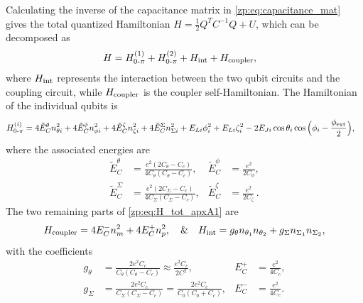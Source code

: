 \begin{widetext}
Calculating the inverse of the capacitance matrix in \cref{zp:eq:capacitance_mat} gives the total quantized Hamiltonian  $H=\frac{1}{2}Q^TC^{-1}Q + U$, which can be decomposed as
\begin{align}\label{zp:eq:H_tot_apxA1}
    H &= H_{0\text{-}\pi}^{(1)} + H_{0\text{-}\pi}^{(2)} + H_{\rm int} + H_{\rm coupler},
\end{align}
where $H_{\rm int}$ represents the interaction between the two qubit circuits and the coupling circuit, while $H_{\rm coupler}$  is the coupler self-Hamiltonian.
The Hamiltonian of the individual \zps qubits is
\begin{align}\label{zp:eq:zp_h_app_i}
    H_{0\text{-}\pi}^{(i)} &=  4\tilde E_C^{\theta} {n}_{\theta i}^2 + 4\tilde E_C^{\phi} {n}_{\phi i}^2  + 4\tilde E_C^{\zeta} {n}_{\zeta i}^2 + 4\tilde E_C^{\Sigma} {n}_{\Sigma i}^2 +
    E_{Li}{\phi}_i^2 + E_{Li}{\zeta}_i^2 - 2E_{Ji}\cos{{\theta}_i}\cos \Big ({\phi}_i - \frac{\phi_{\rm ext}}{2}\Big) ,
\end{align}
where the associated energies are
\begin{subequations}
\begin{align}\label{zp:eq:renormalized_ec}
    \tilde E_{C}^{\theta} &= \frac{e^2(2C_\theta-C_c)}{4C_{\theta}(C_{\theta} - C_c)},
   & \tilde E_{C}^{\phi} &= \frac{e^2}{2C_\phi},
   \\
    \tilde E_{C}^{\Sigma} &= \frac{e^2(2C_\Sigma-C_c)}{4C_{\Sigma}(C_{\Sigma} - C_c)} ,
   & \tilde E_{C}^{\zeta} &= \frac{e^2}{2C_\zeta} \, .
\end{align}
\end{subequations}
The two remaining parts of \cref{zp:eq:H_tot_apxA1} are
\begin{subequations}
\begin{align}
    H_{\rm coupler} = 4E_C^- n_m^2 + 4E_C^+ n_p^2 ,
    \quad {\&}\quad
    H_{\rm int} = g_{\theta} n_{\theta_1}n_{\theta_2} + g_{\Sigma} n_{\Sigma_1}n_{\Sigma_2},
\end{align}
\end{subequations}
with the coefficients
\begin{subequations}\label{zp:eq:coupling_rates_app}
\begin{align}
    g_{\theta} &=\frac{2e^2C_c}{C_{\theta} (C_{\theta} - C_c)} \approx \frac{e^2C_c}{2C^2},
    &E_{C}^{+} &=\frac{e^2}{4C_c},
    \\
    g_{\Sigma} &= \frac{2e^2C_c}{C_{\Sigma}(C_{\Sigma} - C_c)} = \frac{2e^2C_c}{C_0(C_0+C_c)}, &E_{C}^{-} &= \frac{e^2}{4C_c}.
\end{align}

\end{subequations}
\end{widetext}
